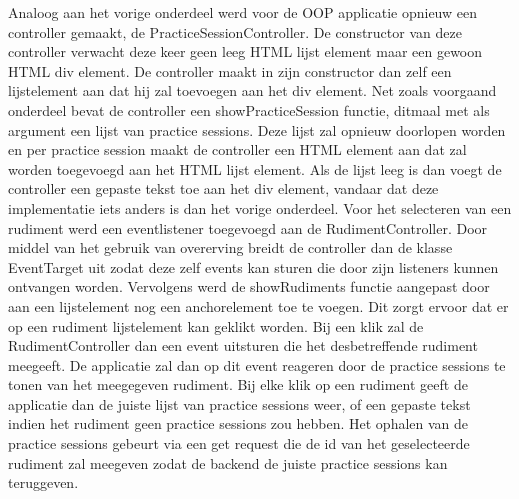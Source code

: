 Analoog aan het vorige onderdeel werd voor de OOP applicatie opnieuw een controller gemaakt, de PracticeSessionController. De constructor van deze controller verwacht deze keer geen leeg HTML lijst element maar een gewoon HTML div element. De controller maakt in zijn constructor dan zelf een lijstelement aan dat hij zal toevoegen aan het div element. Net zoals voorgaand onderdeel bevat de controller een showPracticeSession functie, ditmaal met als argument een lijst van practice sessions. Deze lijst zal opnieuw doorlopen worden en per practice session maakt de controller een HTML element aan dat zal worden toegevoegd aan het HTML lijst element. Als de lijst leeg is dan voegt de controller een gepaste tekst toe aan het div element, vandaar dat deze implementatie iets anders is dan het vorige onderdeel. Voor het selecteren van een rudiment werd een eventlistener toegevoegd aan de RudimentController. Door middel van het gebruik van overerving breidt de controller dan de klasse EventTarget uit zodat deze zelf events kan sturen die door zijn listeners kunnen ontvangen worden. Vervolgens werd de showRudiments functie aangepast door aan een lijstelement nog een anchorelement toe te voegen. Dit zorgt ervoor dat er op een rudiment lijstelement kan geklikt worden. Bij een klik zal de RudimentController dan een event uitsturen die het desbetreffende rudiment meegeeft. De applicatie zal dan op dit event reageren door de practice sessions te tonen van het meegegeven rudiment. Bij elke klik op een rudiment geeft de applicatie dan de juiste lijst van practice sessions weer, of een gepaste tekst indien het rudiment geen practice sessions zou hebben. Het ophalen van de practice sessions gebeurt via een get request die de id van het geselecteerde rudiment zal meegeven zodat de backend de juiste practice sessions kan teruggeven.  


